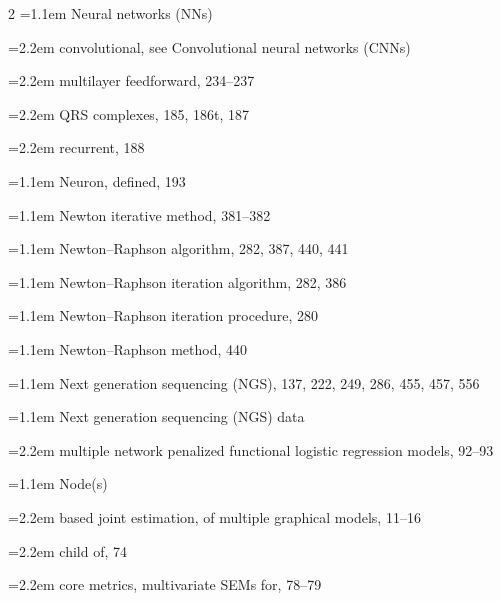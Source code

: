 \begin{multicols}{2}
\noindent\hangindent=1.1em Neural networks (NNs)\par
\noindent\hangindent=2.2em \hspace*{1.1em}convolutional, see Convolutional neural networks (CNNs)\par
\noindent\hangindent=2.2em \hspace*{1.1em}multilayer feedforward, 234--237\par
\noindent\hangindent=2.2em \hspace*{1.1em}QRS complexes, 185, 186t, 187\par
\noindent\hangindent=2.2em \hspace*{1.1em}recurrent, 188\par
\noindent\hangindent=1.1em Neuron, defined, 193\par
\noindent\hangindent=1.1em Newton iterative method, 381--382\par
\noindent\hangindent=1.1em Newton--Raphson algorithm, 282, 387, 440, 441\par
\noindent\hangindent=1.1em Newton--Raphson iteration algorithm, 282, 386\par
\noindent\hangindent=1.1em Newton--Raphson iteration procedure, 280\par
\noindent\hangindent=1.1em Newton--Raphson method, 440\par
\noindent\hangindent=1.1em Next generation sequencing (NGS), 137, 222, 249, 286, 455, 457, 556\par
\noindent\hangindent=1.1em Next generation sequencing (NGS) data\par
\noindent\hangindent=2.2em \hspace*{1.1em}multiple network penalized functional logistic regression models, 92--93\par
\noindent\hangindent=1.1em Node(s)\par
\noindent\hangindent=2.2em \hspace*{1.1em}based joint estimation, of multiple graphical models, 11--16\par
\noindent\hangindent=2.2em \hspace*{1.1em}child of, 74\par
\noindent\hangindent=2.2em \hspace*{1.1em}core metrics, multivariate SEMs for, 78--79\par

\end{multicols}
